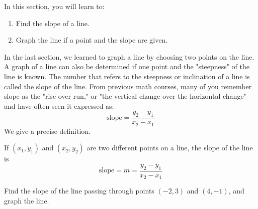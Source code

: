 In this section, you will learn to:
\begin{enumerate}
    \item Find the slope of a line.
    \item Graph the line if a point and the slope are given.
\end{enumerate}

In the last section, we learned to graph a line by choosing two points on the line. A graph of a line can also be determined if one point and the "steepness" of the line is known. The number that refers to the steepness or inclination of a line is called the slope of the line. From previous math courses, many of you remember slope as the "rise over run," or "the vertical change over the horizontal change" and have often seen it expressed as:
\[
\text{slope} = \frac{{y_2 - y_1}}{{x_2 - x_1}}
\]
We give a precise definition.

\begin{definition} If \((x_1, y_1)\) and \((x_2, y_2)\) are two different points on a line, the slope of the line is
\[
\text{slope} = m = \frac{{y_2 - y_1}}{{x_2 - x_1}}
\]
\end{definition}

\begin{example}
Find the slope of the line passing through points \((-2, 3)\) and \((4, -1)\), and graph the line.
\end{example}

